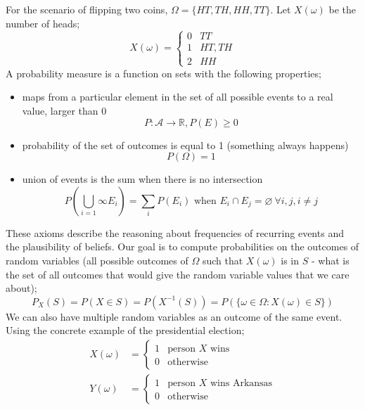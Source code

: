 \documentclass[a4paper, 12pt]{article}
\newcommand{\summation}[2]{\sum\limits_{#1}^{#2}}
\renewcommand{\emptyset}[0]{\varnothing}
\newcommand{\mbbr}[0]{\mathbb{R}}
\begin{document}
                For the scenario of flipping two coins, $\Omega = \{HT, TH, HH, TT\}$.
                Let $X(\omega)$ be the number of heads;
                $$X(\omega) = \begin{cases}
                    0 & TT \\
                    1 & HT, TH \\
                    2 & HH
                \end{cases}$$
                A probability measure is a function on sets with the following properties;
                \begin{itemize}
                    \itemsep0em
                    \item maps from a particular element in the set of all possible events to a real value, larger than $0$
                        $$P : \mathcal{A} \to \mbbr, P(E) \geq 0$$
                    \item probability of the set of outcomes is equal to 1 (something always happens)
                        $$P(\Omega) = 1$$
                    \item union of events is the sum when there is no intersection %
                        $$P\left(\bigcup\limits_{i = 1}{\infty} E_i\right) = \summation{i}{} P(E_i) \text{ when } E_i \cap E_j = \emptyset\ \forall i, j, i \neq j$$
                \end{itemize}
                These axioms describe the reasoning about frequencies of recurring events and the plausibility of beliefs.
                Our goal is to compute probabilities on the outcomes of random variables (all possible outcomes of $\Omega$ such that $X(\omega)$ is in $S$ - what is the set of all outcomes that would give the random variable values that we care about);
                $$P_X(S) = P(X \in S) = P(X^{-1}(S)) = P(\{\omega \in \Omega : X(\omega) \in S\})$$
                We can also have multiple random variables as an outcome of the same event.
                Using the concrete example of the presidential election;
                \begin{align*}
                    X(\omega) & = \begin{cases}
                        1 & \text{person $X$ wins} \\
                        0 & \text{otherwise}
                    \end{cases} \\
                    Y(\omega) & = \begin{cases}
                        1 & \text{person $X$ wins Arkansas} \\
                        0 & \text{otherwise}
                    \end{cases}
                \end{align*}
\end{document}
